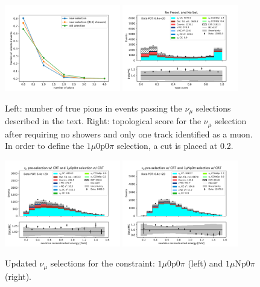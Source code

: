 \begin{center}
\begin{figure}
    \centering
    \includegraphics[width=0.45\textwidth]{technote/SystematicsSensitivity/Figures/npi_musel.pdf}
    \hfill
    \includegraphics[width=0.45\textwidth]{technote/SystematicsSensitivity/Figures/topological_score_1mu0p0pi.pdf}
    \caption{Left: number of true pions in events passing the $\nu_\mu$ selections described in the text. Right: topological score for the $\nu_\mu$ selection after requiring no showers and only one track identified as a muon. In order to define the $1\mu0\mathrm{p}0\pi$ selection, a cut is placed at 0.2.}
    \label{fig:npinumusel} 
\end{figure}
\end{center}

\begin{figure}
    \centering
    \includegraphics[width=0.45\textwidth]{technote/SystematicsSensitivity/Figures/reco_e_1mu0p0pi.pdf}
    \hfill
    \includegraphics[width=0.45\textwidth]{technote/SystematicsSensitivity/Figures/reco_e_1muNp0pi.pdf}
    \caption{Updated $\nu_\mu$ selections for the constraint: $1\mu0\mathrm{p}0\pi$ (left) and $1\mu\mathrm{Np}0\pi$ (right).}
    \label{fig:numu0pisels}
\end{figure}

